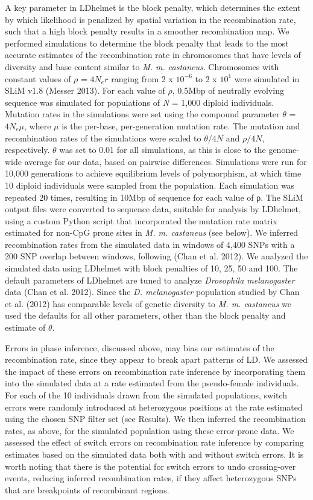         	A key parameter in LDhelmet is the block penalty, which determines the extent by which likelihood is penalized by spatial variation in the recombination rate, such that a high block penalty results in a smoother recombination map. We performed simulations to determine the block penalty that leads to the most accurate estimates of the recombination rate in chromosomes that have levels of diversity and base content similar to \emph{M. m. castaneus}. Chromosomes with constant values of $\rho$ = $4N_{e}r$ ranging from 2 x $10^{-6}$ to 2 x $10^1$ were simulated in SLiM v1.8 (Messer 2013). For each value of $\rho$, 0.5Mbp of neutrally evolving sequence was simulated for populations of \emph{N} = 1,000 diploid individuals. Mutation rates in the simulations were set using the compound parameter $\theta$ = $4N_{e}\mu$, where $\mu$ is the per-base, per-generation mutation rate. The mutation and recombination rates of the simulations were scaled to $\theta/4N$ and $\rho/4N$, respectively. $\theta$ was set to 0.01 for all simulations, as this is close to the genome-wide average for our data, based on pairwise differences. Simulations were run for 10,000 generations to achieve equilibrium levels of polymorphism, at which time 10 diploid individuals were sampled from the population. Each simulation was repeated 20 times, resulting in 10Mbp of sequence for each value of ρ. The SLiM output files were converted to sequence data, suitable for analysis by LDhelmet, using a custom Python script that incorporated the mutation rate matrix estimated for non-CpG prone sites in \emph{M. m. castaneus} (see below). We inferred recombination rates from the simulated data in windows of 4,400 SNPs with a 200 SNP overlap between windows, following (Chan et al. 2012). We analyzed the simulated data using LDhelmet with block penalties of 10, 25, 50 and 100. The default parameters of LDhelmet are tuned to analyze \emph{Drosophila melanogaster} data (Chan et al. 2012). Since the \emph{D. melanogaster} population studied by Chan et al. (2012) has comparable levels of genetic diversity to \emph{M. m. castaneus} we used the defaults for all other parameters, other than the block penalty and estimate of $\theta$.
 
        	Errors in phase inference, discussed above, may bias our estimates of the recombination rate, since they appear to break apart patterns of LD. We assessed the impact of these errors on recombination rate inference by incorporating them into the simulated data at a rate estimated from the pseudo-female individuals. For each of the 10 individuals drawn from the simulated populations, switch errors were randomly introduced at heterozygous positions at the rate estimated using the chosen SNP filter set (see Results). We then inferred the recombination rates, as above, for the simulated population using these error-prone data. We assessed the effect of switch errors on recombination rate inference by comparing estimates based on the simulated data both with and without switch errors. It is worth noting that there is the potential for switch errors to undo crossing-over events, reducing inferred recombination rates, if they affect heterozygous SNPs that are breakpoints of recombinant regions. 

